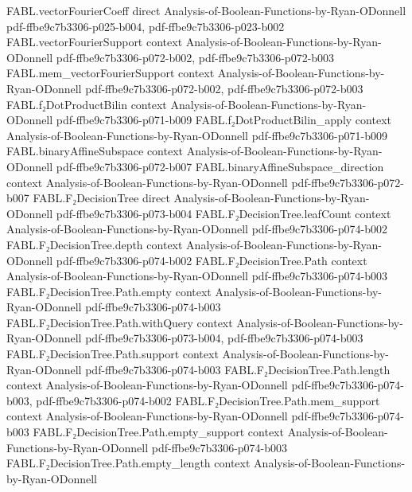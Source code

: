 \begin{theorem}
\proofstep
  {FABL.vectorFourierCoeff}
  {direct}
  {Analysis-of-Boolean-Functions-by-Ryan-ODonnell}
  {pdf-ffbe9c7b3306-p025-b004,
    pdf-ffbe9c7b3306-p023-b002}
\proofstep
  {FABL.vectorFourierSupport}
  {context}
  {Analysis-of-Boolean-Functions-by-Ryan-ODonnell}
  {pdf-ffbe9c7b3306-p072-b002,
    pdf-ffbe9c7b3306-p072-b003}
\proofstep
  {FABL.mem_vectorFourierSupport}
  {context}
  {Analysis-of-Boolean-Functions-by-Ryan-ODonnell}
  {pdf-ffbe9c7b3306-p072-b002,
    pdf-ffbe9c7b3306-p072-b003}
\proofstep
  {FABL.f₂DotProductBilin}
  {context}
  {Analysis-of-Boolean-Functions-by-Ryan-ODonnell}
  {pdf-ffbe9c7b3306-p071-b009}
\proofstep
  {FABL.f₂DotProductBilin_apply}
  {context}
  {Analysis-of-Boolean-Functions-by-Ryan-ODonnell}
  {pdf-ffbe9c7b3306-p071-b009}
\proofstep
  {FABL.binaryAffineSubspace}
  {context}
  {Analysis-of-Boolean-Functions-by-Ryan-ODonnell}
  {pdf-ffbe9c7b3306-p072-b007}
\proofstep
  {FABL.binaryAffineSubspace_direction}
  {context}
  {Analysis-of-Boolean-Functions-by-Ryan-ODonnell}
  {pdf-ffbe9c7b3306-p072-b007}
\proofstep
  {FABL.F₂DecisionTree}
  {direct}
  {Analysis-of-Boolean-Functions-by-Ryan-ODonnell}
  {pdf-ffbe9c7b3306-p073-b004}
\proofstep
  {FABL.F₂DecisionTree.leafCount}
  {context}
  {Analysis-of-Boolean-Functions-by-Ryan-ODonnell}
  {pdf-ffbe9c7b3306-p074-b002}
\proofstep
  {FABL.F₂DecisionTree.depth}
  {context}
  {Analysis-of-Boolean-Functions-by-Ryan-ODonnell}
  {pdf-ffbe9c7b3306-p074-b002}
\proofstep
  {FABL.F₂DecisionTree.Path}
  {context}
  {Analysis-of-Boolean-Functions-by-Ryan-ODonnell}
  {pdf-ffbe9c7b3306-p074-b003}
\proofstep
  {FABL.F₂DecisionTree.Path.empty}
  {context}
  {Analysis-of-Boolean-Functions-by-Ryan-ODonnell}
  {pdf-ffbe9c7b3306-p074-b003}
\proofstep
  {FABL.F₂DecisionTree.Path.withQuery}
  {context}
  {Analysis-of-Boolean-Functions-by-Ryan-ODonnell}
  {pdf-ffbe9c7b3306-p073-b004,
    pdf-ffbe9c7b3306-p074-b003}
\proofstep
  {FABL.F₂DecisionTree.Path.support}
  {context}
  {Analysis-of-Boolean-Functions-by-Ryan-ODonnell}
  {pdf-ffbe9c7b3306-p074-b003}
\proofstep
  {FABL.F₂DecisionTree.Path.length}
  {context}
  {Analysis-of-Boolean-Functions-by-Ryan-ODonnell}
  {pdf-ffbe9c7b3306-p074-b003,
    pdf-ffbe9c7b3306-p074-b002}
\proofstep
  {FABL.F₂DecisionTree.Path.mem_support}
  {context}
  {Analysis-of-Boolean-Functions-by-Ryan-ODonnell}
  {pdf-ffbe9c7b3306-p074-b003}
\proofstep
  {FABL.F₂DecisionTree.Path.empty_support}
  {context}
  {Analysis-of-Boolean-Functions-by-Ryan-ODonnell}
  {pdf-ffbe9c7b3306-p074-b003}
\proofstep
  {FABL.F₂DecisionTree.Path.empty_length}
  {context}
  {Analysis-of-Boolean-Functions-by-Ryan-ODonnell}

\end{theorem}
